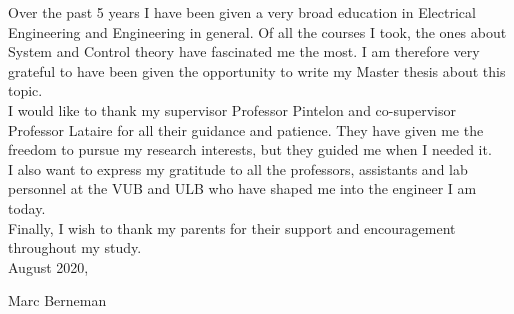 Over the past 5 years I have been given a very broad education in Electrical Engineering and Engineering in general. Of all the courses I took, the ones about System and Control theory have fascinated me the most. I am therefore very grateful to have been given the opportunity to write my Master thesis about this topic.\\

\noindent
I would like to thank my supervisor Professor Pintelon and co-supervisor Professor Lataire for all their guidance and patience. They have given me the freedom to pursue my research interests, but they guided me when I needed it. \\

\noindent
I also want to express my gratitude to all the professors, assistants and lab personnel at the VUB and ULB who have shaped me into the engineer I am today.\\

\noindent
Finally, I wish to thank my parents for their support and encouragement throughout my study.\\


\noindent
August 2020,

\noindent
Marc Berneman